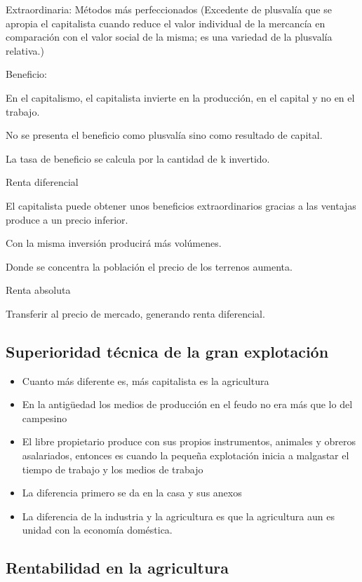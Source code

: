\documentclass[
  letterpaper,
  DIV=11,
  numbers=noendperiod]{scrartcl}
\begin{document}
Extraordinaria: Métodos más perfeccionados (Excedente de plusvalía que
se apropia el capitalista cuando reduce el valor individual de la
mercancía en comparación con el valor social de la misma; es una
variedad de la plusvalía relativa.)

Beneficio:

En el capitalismo, el capitalista invierte en la producción, en el
capital y no en el trabajo.

No se presenta el beneficio como plusvalía sino como resultado de
capital.

La tasa de beneficio se calcula por la cantidad de k invertido.

Renta diferencial

El capitalista puede obtener unos beneficios extraordinarios gracias a
las ventajas produce a un precio inferior.

Con la misma inversión producirá más volúmenes.

Donde se concentra la población el precio de los terrenos aumenta.

Renta absoluta

Transferir al precio de mercado, generando renta diferencial.

\hypertarget{superioridad-tuxe9cnica-de-la-gran-explotaciuxf3n}{%
\subsection{Superioridad técnica de la gran
explotación}\label{superioridad-tuxe9cnica-de-la-gran-explotaciuxf3n}}

\begin{itemize}
\item
  Cuanto más diferente es, más capitalista es la agricultura
\item
  En la antigüedad los medios de producción en el feudo no era más que
  lo del campesino
\item
  El libre propietario produce con sus propios instrumentos, animales y
  obreros asalariados, entonces es cuando la pequeña explotación inicia
  a malgastar el tiempo de trabajo y los medios de trabajo
\item
  La diferencia primero se da en la casa y sus anexos
\item
  La diferencia de la industria y la agricultura es que la agricultura
  aun es unidad con la economía doméstica.
\end{itemize}

\hypertarget{rentabilidad-en-la-agricultura}{%
\subsection{Rentabilidad en la
agricultura}\label{rentabilidad-en-la-agricultura}}
\end{document}
